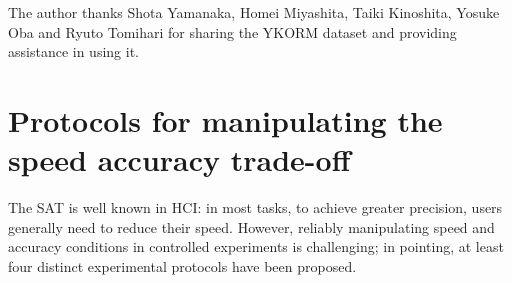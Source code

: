 \documentclass[acmlarge, manuscript,review]{acmart}
\newcommand{\ide}{\ensuremath{{\text{ID}_e}}\xspace}
\begin{document}












\begin{acks}
	The author thanks Shota Yamanaka, Homei Miyashita, Taiki Kinoshita, Yosuke Oba and Ryuto Tomihari for sharing the YKORM dataset and providing assistance in using it.
\end{acks}




\appendix


\section{Protocols for manipulating the speed accuracy trade-off \label{subs:background::protocols}}
The SAT is well known in HCI: in most tasks, to achieve greater precision, users generally need to reduce their speed. However, reliably manipulating speed and accuracy conditions in controlled experiments is challenging; in pointing, at least four distinct experimental protocols have been proposed.
\end{document}
